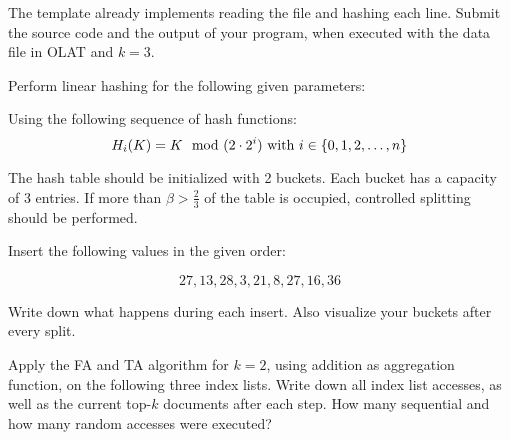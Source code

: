 The template already implements reading the file and hashing each line.
Submit the source code and the output of your program, when executed with the data file in OLAT and $k=3$.

\newpage
{}

Perform linear hashing for the following given parameters:

Using the following sequence of hash functions:
\[
H_i(K) = K \mod (2 \cdot 2^i) \textnormal{ with } i \in \{0, 1, 2, \dots, n\}
\]

The hash table should be initialized with 2 buckets.
Each bucket has a capacity of 3 entries.
If more than $\beta > \frac{2}{3}$ of the table is occupied, controlled splitting should be performed.

Insert the following values in the given order:

\[
27, 13, 28, 3, 21, 8, 27, 16, 36
\]

Write down what happens during each insert.
Also visualize your buckets after every split.


Apply the FA and TA algorithm for $k=2$, using addition as aggregation function, on the following three index lists.
 Write down all index list accesses, as well as the current top-$k$ documents after each step.
 How many sequential and how many random accesses were executed?

